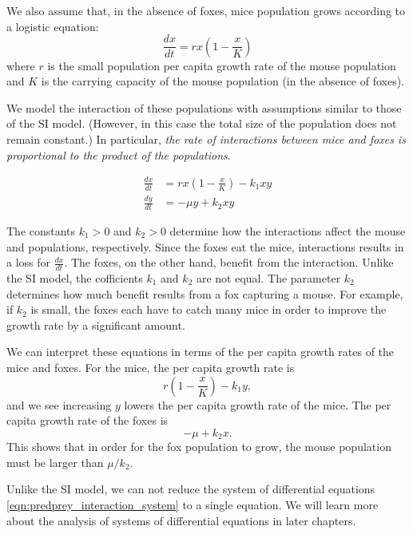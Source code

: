 \documentclass[reqno]{immbook}
\numberwithin{equation}{chapter}
\numberwithin{question}{section}
\numberwithin{theorem}{chapter}
\numberwithin{figure}{chapter}
\theoremstyle{definition}
\begin{document}
We also assume that, in the absence of foxes,
mice population grows
according to a logistic equation:
\begin{equation}
   \frac{dx}{dt} = rx\left(1-\frac{x}{K}\right)
\end{equation}
where $r$ is the small population per capita growth rate
of the mouse population and $K$ is the carrying capacity
of the mouse population (in the absence of foxes).

We model the interaction of these populations
with assumptions similar to those of the SI model.
(However, in this case the total size of the population
does not remain constant.)
In particular,
\emph{the rate of interactions between
mice and foxes is proportional to the product
of the populations}.

\begin{equation}
\begin{split}
   \frac{dx}{dt} & = rx\left(1-\frac{x}{K}\right) - k_1xy \\
   \frac{dy}{dt} & = -\mu y + k_2xy
\end{split}
\label{eqn:predprey_interaction_system}
\end{equation}

The constants $k_1 > 0$ and $k_2 > 0$ determine how the
interactions affect the mouse and populations, respectively.
Since the foxes eat the mice, interactions results
in a loss for $\frac{dx}{dt}$.
The foxes, on the other hand, benefit from the interaction.
Unlike the SI model, the cofficients $k_1$ and $k_2$
are not equal.  The parameter $k_2$ determines
how much benefit results from a fox capturing a mouse.
For example, if $k_2$ is small, 
the foxes each have to catch many mice in order to improve
the growth rate by a significant amount.

We can interpret these equations in terms of the
per capita growth rates of the mice and foxes.
For the mice, the per capita growth rate
is
\begin{equation}
      r\left(1-\frac{x}{K}\right)-k_1 y,
\end{equation}
and we see increasing
$y$ lowers the per capita growth rate of the
mice.
The per capita growth rate of the foxes
is
\begin{equation}
-\mu + k_2 x.
\end{equation}
This shows that in order
for the fox population to grow, the mouse 
population must be larger than $\mu/k_2$.

Unlike the SI model, we can not reduce the system
of differential equations
\eqref{eqn:predprey_interaction_system}
to a single equation.
We will learn more about the analysis of systems
of differential equations in later chapters.
\end{document}
